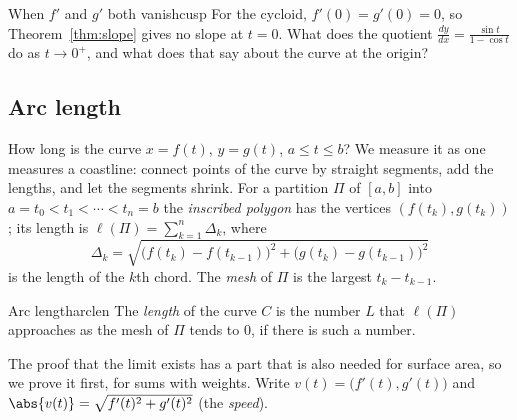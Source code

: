 \documentclass[11pt]{article}
\begin{document}
\begin{think}{When $f'$ and $g'$ both vanish}{cusp}
For the cycloid, $f'(0)=g'(0)=0$, so Theorem~\ref{thm:slope} gives no slope at $t=0$. What does the quotient $\frac{dy}{dx}=\frac{\sin t}{1-\cos t}$ do as $t\to0^+$, and what does that say about the curve at the origin?
\end{think}

\subsection*{Arc length}

How long is the curve $x=f(t)$, $y=g(t)$, $a\le t\le b$? We measure it as one measures a coastline: connect points of the curve by straight segments, add the lengths, and let the segments shrink. For a partition $\Pi$ of $[a,b]$ into $a=t_0<t_1<\cdots<t_n=b$ the \emph{inscribed polygon} has the vertices $(f(t_k),g(t_k))$; its length is $\ell(\Pi)=\sum_{k=1}^n\Delta_k$, where
\[
\Delta_k=\sqrt{\bigl(f(t_k)-f(t_{k-1})\bigr)^2+\bigl(g(t_k)-g(t_{k-1})\bigr)^2}
\]
is the length of the $k$th chord. The \emph{mesh} of $\Pi$ is the largest $t_k-t_{k-1}$.

\begin{defn}{Arc length}{arclen}
The \emph{length} of the curve $C$ is the number $L$ that $\ell(\Pi)$ approaches as the mesh of $\Pi$ tends to $0$, if there is such a number.
\end{defn}

The proof that the limit exists has a part that is also needed for surface area, so we prove it first, for sums with weights. Write $v(t)=\bigl(f'(t),g'(t)\bigr)$ and $\abs{v(t)}=\sqrt{f'(t)^2+g'(t)^2}$ (the \emph{speed}).
\end{document}
